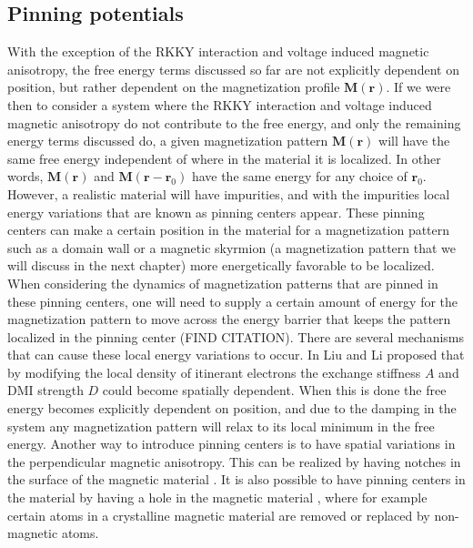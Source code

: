 \subsection{Pinning potentials}
With the exception of the RKKY interaction and voltage induced magnetic anisotropy, the free energy terms discussed so far are not explicitly dependent on position, but rather dependent on the magnetization profile $\mathbold{M}(\mathbold{r})$. If we were then to consider a system where the RKKY interaction and voltage induced magnetic anisotropy do not contribute to the free energy, and only the remaining energy terms discussed do, a given magnetization pattern $\mathbold{M}(\mathbold{r})$ will have the same free energy independent of where in the material it is localized. In other words, $\mathbold{M}(\mathbold{r})$ and $\mathbold{M}(\mathbold{r}-\mathbold{r}_0)$ have the same energy for any choice of $\mathbold{r}_0$. However, a realistic material will have impurities, and with the impurities local energy variations that are known as pinning centers appear. These pinning centers can make a certain position in the material for a magnetization pattern such as a domain wall or a magnetic skyrmion (a magnetization pattern that we will discuss in the next chapter) more energetically favorable to be localized. When considering the dynamics of magnetization patterns that are pinned in these pinning centers, one will need to supply a certain amount of energy for the magnetization pattern to move across the energy barrier that keeps the pattern localized in the pinning center (FIND CITATION). There are several mechanisms that can cause these local energy variations to occur. In \cite{LiuLi2013} Liu and Li proposed that by modifying the local density of itinerant electrons the exchange stiffness $A$ and DMI strength $D$ could become spatially dependent. When this is done the free energy becomes explicitly dependent on position, and due to the damping in the system any magnetization pattern will relax to its local minimum in the free energy. Another way to introduce pinning centers is to have spatial variations in the perpendicular magnetic anisotropy. This can be realized by having notches in the surface of the magnetic material \cite{Sampaio2013}. It is also possible to have pinning centers in the material by having a hole in the magnetic material \cite{Muller2015}, where for example certain atoms in a crystalline magnetic material are removed or replaced by non-magnetic atoms. 

